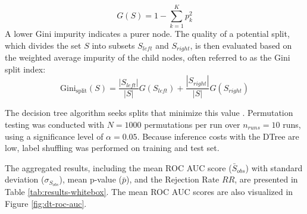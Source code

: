 \begin{equation}
  G(S) = 1 - \sum_{k=1}^{K} p_k^2
  \label{eq:gini_impurity}
\end{equation}
A lower Gini impurity indicates a purer node. The quality of a potential split, which divides the set $S$ into subsets $S_{left}$ and $S_{right}$, is then evaluated based on the weighted average impurity of the child nodes, often referred to as the Gini split index:
\begin{equation}
  \text{Gini}_{\text{split}}(S) = \frac{|S_{left}|}{|S|} G(S_{left}) + \frac{|S_{right}|}{|S|} G(S_{right})
  \label{eq:gini_split}
\end{equation}

The decision tree algorithm seeks splits that minimize this value \autocite{breiman1984classification}. Permutation testing was conducted with $N = 1000$ permutations per run over $n_{runs}=10$ runs, using a significance level of $\alpha = 0.05$. Because inference costs with the DTree are low, label shuffling was performed on training and test set.

The aggregated results, including the mean ROC AUC score ($\bar{S}_{obs}$) with standard deviation ($\sigma_{S_{obs}}$), mean p-value ($\bar{p}$), and the Rejection Rate $RR$, are presented in Table \ref{tab:results-whitebox}. The mean ROC AUC scores are also visualized in Figure \ref{fig:dt-roc-auc}.

